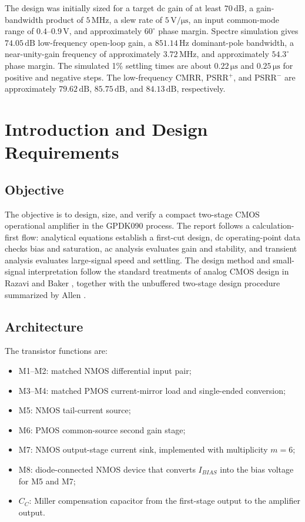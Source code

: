 \documentclass[11pt,a4paper]{report}
\newcommand{\micro}{\mu}
\newcommand{\SI}[2]{\ensuremath{#1\,\mathrm{#2}}}
\newcommand{\SIrange}[3]{\ensuremath{#1\text{--}#2\,\mathrm{#3}}}
\newcommand{\ang}[1]{\ensuremath{#1^{\circ}}}
\begin{document}
The design was initially sized for a target dc gain of at least \SI{70}{dB}, a gain-bandwidth product of \SI{5}{MHz}, a slew rate of \SI{5}{V/\micro s}, an input common-mode range of \SIrange{0.4}{0.9}{V}, and approximately \ang{60} phase margin. Spectre simulation gives \SI{74.05}{dB} low-frequency open-loop gain, a \SI{851.14}{Hz} dominant-pole bandwidth, a near-unity-gain frequency of approximately \SI{3.72}{MHz}, and approximately \ang{54.3} phase margin. The simulated 1\% settling times are about \SI{0.22}{\micro s} and \SI{0.25}{\micro s} for positive and negative steps. The low-frequency CMRR, PSRR$^+$, and PSRR$^-$ are approximately \SI{79.62}{dB}, \SI{85.75}{dB}, and \SI{84.13}{dB}, respectively.

\tableofcontents
\clearpage
{}

\chapter{Introduction and Design Requirements}

\section{Objective}
The objective is to design, size, and verify a compact two-stage CMOS operational amplifier in the GPDK090 process. The report follows a calculation-first flow: analytical equations establish a first-cut design, dc operating-point data checks bias and saturation, ac analysis evaluates gain and stability, and transient analysis evaluates large-signal speed and settling. The design method and small-signal interpretation follow the standard treatments of analog CMOS design in Razavi and Baker \cite{razavi,baker}, together with the unbuffered two-stage design procedure summarized by Allen \cite{allen}.

\section{Architecture}
The transistor functions are:
\begin{itemize}[leftmargin=18mm]
  \item M1--M2: matched NMOS differential input pair;
  \item M3--M4: matched PMOS current-mirror load and single-ended conversion;
  \item M5: NMOS tail-current source;
  \item M6: PMOS common-source second gain stage;
  \item M7: NMOS output-stage current sink, implemented with multiplicity $m=6$;
  \item M8: diode-connected NMOS device that converts $I_{BIAS}$ into the bias voltage for M5 and M7;
  \item $C_C$: Miller compensation capacitor from the first-stage output to the amplifier output.
\end{itemize}
\end{document}
